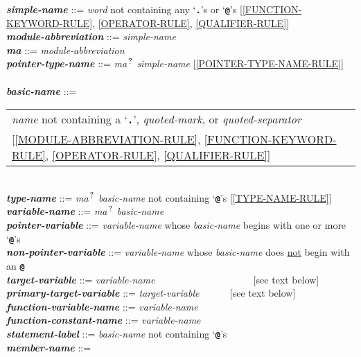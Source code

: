 \documentclass[12pt]{article}
\newcommand{\TT}[1]{{\tt \bfseries #1}}
\newcommand{\QMARK}{{$^{\,\mbox{\footnotesize ?}}$}}
\newcommand{\MA}{{\em ma}\QMARK}
\newcommand{\emkey}[1]{{\em \bfseries #1}}
\newenvironment{indpar}[1][0.3in]%
	{\begin{list}{}%
		     {\setlength{\itemsep}{0in}%
		      \setlength{\topsep}{0in}%
		      \setlength{\parsep}{1ex}%
		      \setlength{\labelwidth}{#1}%
		      \setlength{\leftmargin}{#1}%
		      \addtolength{\leftmargin}{\labelsep}}%
	 \item}%
	{\end{list}}
\begin{document}
\begin{indpar}
\emkey{simple-name} ::= {\em word} not containing any `\TT{.}'s or `\TT{@}'s
    [\ref{FUNCTION-KEYWORD-RULE},
     \ref{OPERATOR-RULE},
     \ref{QUALIFIER-RULE}] \\
\emkey{module-abbreviation}\label{MODULE-ABBREVIATION} ::= {\em simple-name} \\
\emkey{ma} ::= {\em module-abbreviation} \\
\emkey{pointer-type-name}\label{POINTER-TYPE-NAME} ::=
    \MA{} {\em simple-name}
    [\ref{POINTER-TYPE-NAME-RULE}] \\
\\[1ex]
\emkey{basic-name}\label{BASIC-NAME} ::=
	\begin{tabular}[t]{@{}l}
	{\em name} not containing a `\TT{.}', {\em quoted-mark}, or
	    {\em quoted-separator} \\{}
	[\ref{MODULE-ABBREVIATION-RULE},
	 \ref{FUNCTION-KEYWORD-RULE},
	 \ref{OPERATOR-RULE},
	 \ref{QUALIFIER-RULE}] \\
	\end{tabular} \\
\emkey{type-name}\label{TYPE-NAME} ::=
    \MA{} {\em basic-name} not containing `\TT{@}'s
	[\ref{TYPE-NAME-RULE}] \\
\emkey{variable-name}\label{VARIABLE-NAME} ::=
    \MA{} {\em basic-name} \\
\emkey{pointer-variable}\label{POINTER-VARIABLE} ::=
    {\em variable-name} whose {\em basic-name} begins with one or more
    `\TT{@}'s \\
\emkey{non-pointer-variable}\label{NON-POINTER-VARIABLE} ::=
    {\em variable-name} whose {\em basic-name} does \underline{not}
    begin with an \TT{@} \\
\emkey{target-variable}\label{TARGET-VARIABLE} ::=
    {\em variable-name} ~~~~~~~~~~~~~~~~~~~ [see text below] \\
\emkey{primary-target-variable}\label{PRIMARY-TARGET-VARIABLE} ::=
    {\em target-variable} ~~~~~ [see text below] \\
\emkey{function-variable-name}\label{FUNCTION-VARIABLE-NAME} ::=
    {\em variable-name} \\
\emkey{function-constant-name}\label{FUNCTION-CONSTANT-NAME} ::=
    {\em variable-name} \\
\emkey{statement-label} ::= {\em basic-name}
    \label{STATEMENT-LABEL} not containing `\TT{@}'s
\\[1ex]
\emkey{member-name}\label{MEMBER-NAME}
	::= \begin{tabular}[t]{@{}l@{}}

\end{tabular}
\end{indpar}
\end{document}

